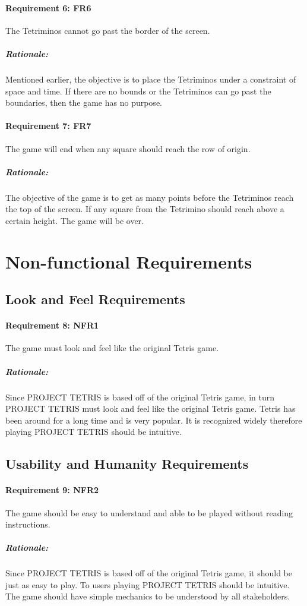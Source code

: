 \documentclass[12pt, titlepage]{article}
\begin{document}
\paragraph{Requirement 6: FR6}
The Tetriminos cannot go past the border of the screen.
\subparagraph{Rationale:}
Mentioned earlier, the objective is to place the Tetriminos under a constraint of space and time. If there are no bounds or the Tetriminos can go past the boundaries, then the game has no purpose.
\paragraph{Requirement 7: FR7}
The game will end when any square should reach the row of origin.
\subparagraph{Rationale:}
The objective of the game is to get as many points before the Tetriminos reach the top of the screen. If any square from the Tetrimino should reach above a certain height. The game will be over.

\section{Non-functional Requirements}
\subsection{Look and Feel Requirements}
\paragraph{Requirement 8: NFR1}
The game must look and feel like the original Tetris game. 
\subparagraph{Rationale:}
Since PROJECT TETRIS is based off of the original Tetris game, in turn PROJECT TETRIS must look and feel like the original Tetris game. Tetris has been around for a long time and is very popular. It is recognized widely therefore playing PROJECT TETRIS should be intuitive.

\subsection{Usability and Humanity Requirements}
\paragraph{Requirement 9: NFR2}
The game should be easy to understand and able to be played without reading instructions.
\subparagraph{Rationale:}
Since PROJECT TETRIS is based off of the original Tetris game, it should be just as easy to play. To users playing PROJECT TETRIS should be intuitive. The game should have simple mechanics to be understood by all stakeholders.
\end{document}
